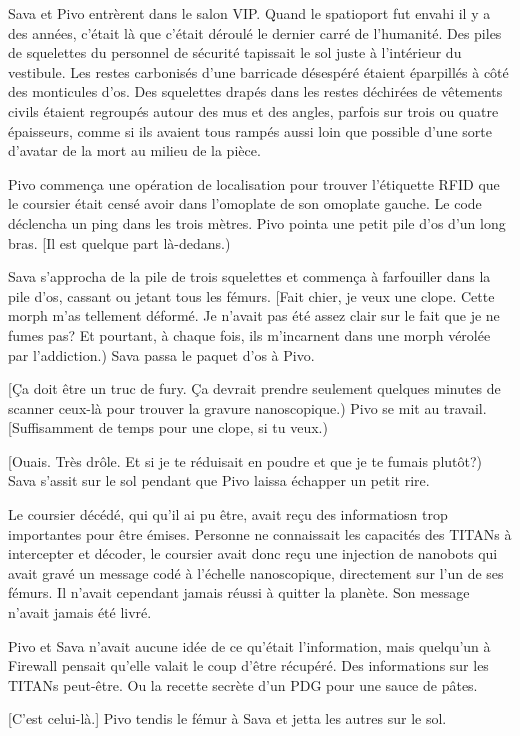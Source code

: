 Sava et Pivo entrèrent dans le salon VIP. Quand le spatioport fut envahi il y a des années, c'était là que c'était déroulé le dernier carré de l'humanité. Des piles de squelettes du personnel de sécurité tapissait le sol juste à l'intérieur du vestibule. Les restes carbonisés d'une barricade désespéré étaient éparpillés à côté des monticules d'os. Des squelettes drapés dans les restes déchirées de vêtements civils étaient regroupés autour des mus et des angles, parfois sur trois ou quatre épaisseurs, comme si ils avaient tous rampés aussi loin que possible d'une sorte d'avatar de la mort au milieu de la pièce. 

Pivo commença une opération de localisation pour trouver l'étiquette RFID que le coursier était censé avoir dans l'omoplate de son omoplate gauche. Le code déclencha un ping dans les trois mètres. Pivo pointa une petit pile d'os d'un long bras. [Il est quelque part là-dedans.) 

Sava s'approcha de la pile de trois squelettes et commença à farfouiller dans la pile d'os, cassant ou jetant tous les fémurs. [Fait chier, je veux une clope. Cette morph m'as tellement déformé. Je n'avait pas été assez clair sur le fait que je ne fumes pas? Et pourtant, à chaque fois, ils m'incarnent dans une morph vérolée par l'addiction.) Sava passa le paquet d'os à Pivo. 

[Ça doit être un truc de fury. Ça devrait prendre seulement quelques minutes de scanner ceux-là pour trouver la gravure nanoscopique.) Pivo se mit au travail. [Suffisamment de temps pour une clope, si tu veux.) 

[Ouais. Très drôle. Et si je te réduisait en poudre et que je te fumais plutôt?) Sava s'assit sur le sol pendant que Pivo laissa échapper un petit rire. 

Le coursier décédé, qui qu'il ai pu être, avait reçu des informatiosn trop importantes pour être émises. Personne ne connaissait les capacités des TITANs à intercepter et décoder, le coursier avait donc reçu une injection de nanobots qui avait gravé un message codé à l'échelle nanoscopique, directement sur l'un de ses fémurs. Il n'avait cependant jamais réussi à quitter la planète. Son message n'avait jamais été livré. 

Pivo et Sava n'avait aucune idée de ce qu'était l'information, mais quelqu'un à Firewall  pensait qu'elle valait le coup d'être récupéré. Des informations sur les TITANs peut-être. Ou la recette secrète d'un PDG pour une sauce de pâtes. 

[C'est celui-là.] Pivo tendis le fémur à Sava et jetta les autres sur le sol. 

